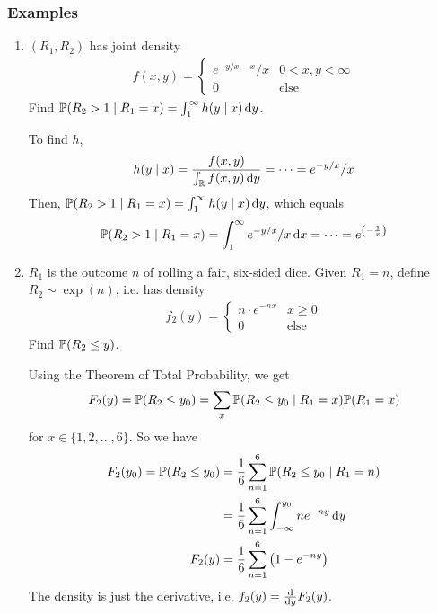 \subsubsection{Examples}
\begin{enumerate}
    \item $(R_1,R_2)$ has joint density
    \begin{align}
        f(x,y) = \begin{cases}
            e^{-y/x - x}/x & 0 < x,y < \infty\\
            0 & \text{else}
        \end{cases}
    \end{align}
    Find $\mathbb{P}(R_2 > 1 \mid R_1 = x) = \int_1^\infty h(y \mid x) \dd{y}$.
    \begin{solution}
        To find $h$,
        \begin{align}
            h(y \mid x) = \frac{f(x,y)}{\int_{\mathbb{R}} f(x,y) \dd{y}} = \cdots = e^{-y/x}/x
        \end{align}
        Then, $\mathbb{P}(R_2 > 1 \mid R_1 = x) = \int_1^\infty h(y \mid x) \dd{y}$, which equals
        \begin{align}
            \mathbb{P}(R_2 > 1 \mid R_1 = x) = \int_1^\infty e^{-y/x}/x \dd{x} = \cdots = e^{\qty(-\frac{1}{x})}
        \end{align}
    \end{solution}
    \item $R_1$ is the outcome $n$ of rolling a fair, six-sided dice. Given $R_1 = n$, define $R_2 \sim \exp(n)$, i.e. has density
    \begin{align}
        f_2(y) = \begin{cases}
            n \cdot e^{-n x} & x \ge 0\\
            0 & \text{else}
        \end{cases}
    \end{align}
    Find $\mathbb{P}(R_2 \le y)$.
    \begin{solution}
        Using the Theorem of Total Probability, we get
        \begin{align}
            F_2(y) = \mathbb{P}(R_2 \le y_0) = \sum_x \mathbb{P}(R_2 \le y_0 \mid R_1 = x) \mathbb{P}(R_1 = x)
        \end{align}
        for $x \in \{ 1, 2, \ldots, 6 \}$. So we have
        \begin{align}
            F_2(y_0) = \mathbb{P}(R_2 \le y_0) &= \frac{1}{6} \sum_{n=1}^6 \mathbb{P}(R_2 \le y_0 \mid R_1 = n)\\
            &= \frac{1}{6} \sum_{n=1}^6 \int_{-\infty}^{y_0} n e^{-n y} \dd{y}\\
            F_2(y) &= \frac{1}{6} \sum_{n=1}^6 \qty( 1 - e^{-ny} )
        \end{align}
        The density is just the derivative, i.e. $f_2(y) = \dv{y} F_2(y)$.
    \end{solution}
\end{enumerate}

